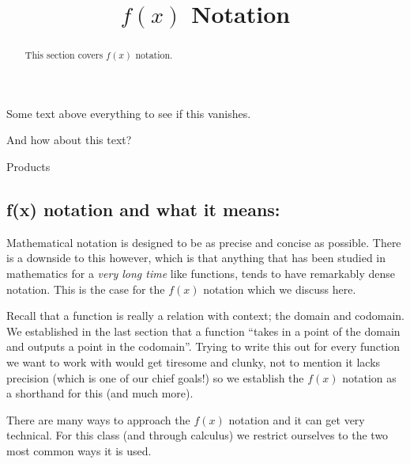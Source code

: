 \documentclass{ximera}
\title{$f(x)$ Notation}
\begin{document}
\begin{abstract}
    This section covers $f(x)$ notation.
\end{abstract}
\maketitle
\newenvironment{htmlCom}{\special{html <h1>}}{\special{html </ht>}}

Some text above everything to see if this vanishes.

\vspace*{4cm}

And how about this text?


\begin{htmlCom}
Products
\end{htmlCom}

\subsection*{\textbf{f(x) notation and what it means:}}

    Mathematical notation is designed to be as precise and concise as possible. There is a downside to this however, which is that anything that has been studied in mathematics for a \textit{very long time} like functions, tends to have remarkably dense notation. This is the case for the $f(x)$ notation which we discuss here.
    
    Recall that a function is really a relation with context; the domain and codomain. We established in the last section that a function ``takes in a point of the domain and outputs a point in the codomain''. Trying to write this out for every function we want to work with would get tiresome and clunky, not to mention it lacks precision (which is one of our chief goals!) so we establish the $f(x)$ notation as a shorthand for this (and much more).
    
    There are many ways to approach the $f(x)$ notation and it can get very technical. For this class (and through calculus) we restrict ourselves to the two most common ways it is used.
    
\end{document}
